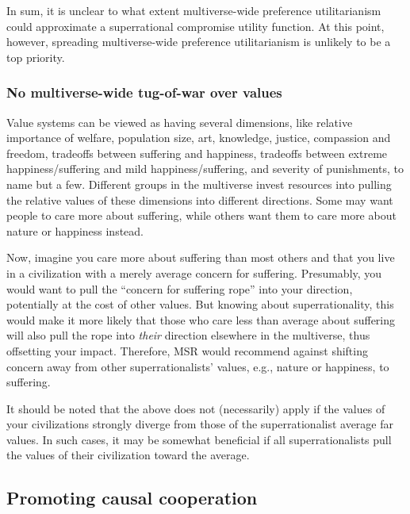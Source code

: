 In sum, it is unclear to what extent multiverse-wide preference
utilitarianism could approximate a superrational compromise utility
function. At this point, however, spreading multiverse-wide preference
utilitarianism is unlikely to be a top priority.

\subsubsection{No multiverse-wide tug-of-war over
values}\label{no-multiverse-wide-tug-of-war-over-values}

Value systems can be viewed as having several dimensions, like relative
importance of welfare, population size, art, knowledge, justice,
compassion and freedom, tradeoffs between suffering and happiness,
tradeoffs between extreme happiness/suffering and mild
happiness/suffering, and severity of punishments, to name but a few.
Different groups in the multiverse invest resources into pulling the
relative values of these dimensions into different directions. Some may
want people to care more about suffering, while others want them to care
more about nature or happiness instead.

Now, imagine you care more about suffering than most others and that you
live in a civilization with a merely average concern for suffering.
Presumably, you would want to pull the ``concern for suffering rope''
into your direction, potentially at the cost of other values. But
knowing about superrationality, this would make it more likely that
those who care less than average about suffering will also pull the rope
into \emph{their} direction elsewhere in the multiverse, thus offsetting
your impact. Therefore, MSR would recommend against shifting concern
away from other superrationalists' values, e.g., nature or happiness, to
suffering.

It should be noted that the above does not (necessarily) apply if the
values of your civilizations strongly diverge from those of the
superrationalist average far values. In such cases, it may be somewhat
beneficial if all superrationalists pull the values of their
civilization toward the average.

\subsection{Promoting causal
cooperation}\label{promoting-causal-cooperation}

